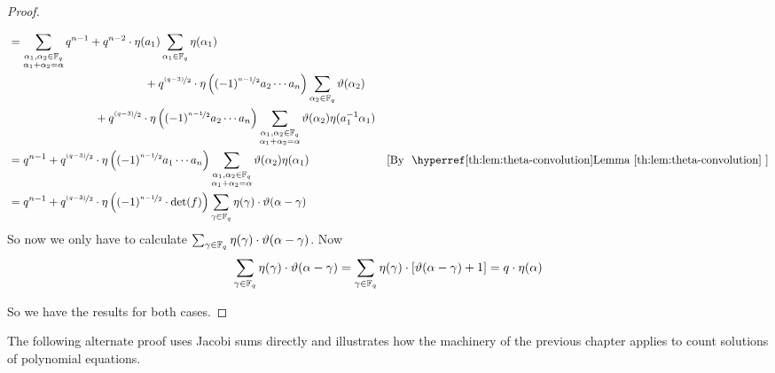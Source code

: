 \begin{proof}
\begin{enumerate}[label=(\roman*)]
\begin{align*}
    & = \sum_{\substack{\alpha_1,\alpha_2\in\bbF_q\\ \alpha_1+\alpha_2=\alpha}}q^{n-1}+q^{n-2}\cdot \eta(a_1)\sum_{\alpha_1\in\bbF_q}\eta(\alpha_1)\\ 
    & \qquad\qquad\qquad\qquad\qquad\qquad+q^{\nicefrac{(q-3)}{2}}\cdot \eta\lt((-1)^{\nicefrac{n-1}2}a_2\cdots a_n\rt)\sum_{\alpha_2\in\bbF_q}\vth(\alpha_2)\\ 
    &\qquad\qquad\qquad\quad\ \; + q^{\nicefrac{(q-3)}{2}}\cdot \eta\lt((-1)^{\nicefrac{n-1}2}a_2\cdots a_n\rt)\sum_{\substack{\alpha_1,\alpha_2\in\bbF_q\\ \alpha_1+\alpha_2=\alpha}}\vth(\alpha_2)\eta(a_1^{-1}\alpha_1)\\ 
    & = q^{n-1}+ q^{\nicefrac{(q-3)}{2}}\cdot \eta\lt((-1)^{\nicefrac{n-1}2}a_1\cdots a_n\rt)\sum_{\substack{\alpha_1,\alpha_2\in\bbF_q\\ \alpha_1+\alpha_2=\alpha}}\vth(\alpha_2)\eta(\alpha_1)\by{\QFConvProplem}\\ 
    & = q^{n-1}+ q^{\nicefrac{(q-3)}{2}}\cdot \eta\lt((-1)^{\nicefrac{n-1}2}\cdot \det(f)\rt)\sum_{\gm\in\bbF_q}\eta(\gm)\cdot \vth(\alpha-\gm)
  \end{align*}So now we only have to calculate $\sum_{\gamma\in\mathbb{F}_q}\eta(\gamma)\cdot \vartheta(\alpha-\gamma)$. Now $$\sum_{\gamma\in\mathbb{F}_q}\eta(\gamma)\cdot \vartheta(\alpha-\gamma)=\sum_{\gamma\in\mathbb{F}_q}\eta(\gamma)\cdot [\vartheta(\alpha-\gamma)+1]=q\cdot \eta(\alpha)$$
  \end{enumerate}
  So we have the results for both cases. 
\end{proof}

The following alternate proof uses Jacobi sums directly and illustrates how the machinery of the previous chapter applies to count solutions of polynomial equations.


